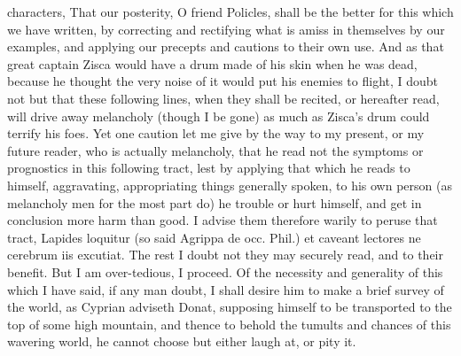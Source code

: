 {characters, That our posterity, O friend Policles, shall be the better
for this which we have written, by correcting and rectifying what is
amiss in themselves by our examples, and applying our precepts and
cautions to their own use. And as that great captain Zisca would have a
drum made of his skin when he was dead, because he thought the very
noise of it would put his enemies to flight, I doubt not but that these
following lines, when they shall be recited, or hereafter read, will
drive away melancholy (though I be gone) as much as Zisca's drum could
terrify his foes. Yet one caution let me give by the way to my present,
or my future reader, who is actually melancholy, that he read not the
symptoms or prognostics in this following tract, lest by applying
that which he reads to himself, aggravating, appropriating things
generally spoken, to his own person (as melancholy men for the most
part do) he trouble or hurt himself, and get in conclusion more harm
than good. I advise them therefore warily to peruse that tract, Lapides
loquitur (so said Agrippa de occ. Phil.) et caveant lectores ne
cerebrum iis excutiat. The rest I doubt not they may securely read, and
to their benefit. But I am over-tedious, I proceed.
Of the necessity and generality of this which I have said, if any man
doubt, I shall desire him to make a brief survey of the world, as 
Cyprian adviseth Donat, supposing himself to be transported to the top
of some high mountain, and thence to behold the tumults and chances of
this wavering world, he cannot choose but either laugh at, or pity it.

}
